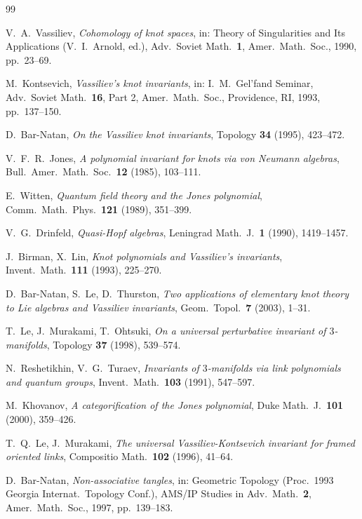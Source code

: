 \documentclass[12pt,a4paper]{amsart}
\theoremstyle{definition}
\begin{document}
\begin{thebibliography}{99}

V.\ A.\ Vassiliev,
\textit{Cohomology of knot spaces},
in: Theory of Singularities and Its Applications (V.\ I.\ Arnold, ed.),
Adv.\ Soviet Math.\ \textbf{1}, Amer.\ Math.\ Soc., 1990, pp.\ 23--69.

M.\ Kontsevich,
\textit{Vassiliev's knot invariants},
in: I.\ M.\ Gel'fand Seminar, Adv.\ Soviet Math.\ \textbf{16}, Part 2,
Amer.\ Math.\ Soc., Providence, RI, 1993, pp.\ 137--150.

D.\ Bar-Natan,
\textit{On the Vassiliev knot invariants},
Topology \textbf{34} (1995), 423--472.

V.\ F.\ R.\ Jones,
\textit{A polynomial invariant for knots via von Neumann algebras},
Bull.\ Amer.\ Math.\ Soc.\ \textbf{12} (1985), 103--111.

E.\ Witten,
\textit{Quantum field theory and the Jones polynomial},
Comm.\ Math.\ Phys.\ \textbf{121} (1989), 351--399.

V.\ G.\ Drinfeld,
\textit{Quasi-Hopf algebras},
Leningrad Math.\ J.\ \textbf{1} (1990), 1419--1457.

J.\ Birman, X.\ Lin,
\textit{Knot polynomials and Vassiliev's invariants},
Invent.\ Math.\ \textbf{111} (1993), 225--270.

D.\ Bar-Natan, S.\ Le, D.\ Thurston,
\textit{Two applications of elementary knot theory to Lie algebras and Vassiliev invariants},
Geom.\ Topol.\ \textbf{7} (2003), 1--31.

T.\ Le, J.\ Murakami, T.\ Ohtsuki,
\textit{On a universal perturbative invariant of $3$-manifolds},
Topology \textbf{37} (1998), 539--574.

N.\ Reshetikhin, V.\ G.\ Turaev,
\textit{Invariants of $3$-manifolds via link polynomials and quantum groups},
Invent.\ Math.\ \textbf{103} (1991), 547--597.

M.\ Khovanov,
\textit{A categorification of the Jones polynomial},
Duke Math.\ J.\ \textbf{101} (2000), 359--426.

T.\ Q.\ Le, J.\ Murakami,
\textit{The universal Vassiliev-Kontsevich invariant for framed oriented links},
Compositio Math.\ \textbf{102} (1996), 41--64.

D.\ Bar-Natan,
\textit{Non-associative tangles},
in: Geometric Topology (Proc.\ 1993 Georgia Internat.\ Topology Conf.),
AMS/IP Studies in Adv.\ Math.\ \textbf{2}, Amer.\ Math.\ Soc., 1997, pp.\ 139--183.


\end{thebibliography}
\end{document}
